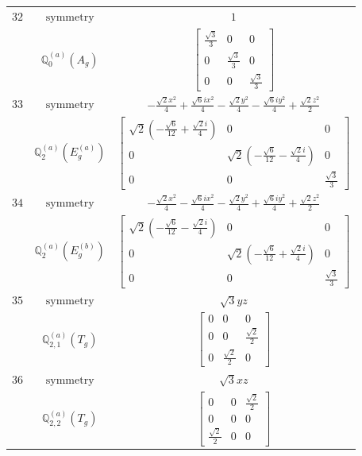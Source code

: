 \documentclass[fleqn,8pt,landscape]{jsarticle}
\begin{document}
\begin{longtable}{ccc}
$ 32 $ & $ \text{symmetry} $ & $ 1 $ \\
$  $ & $ \mathbb{Q}_{0}^{(a)}(A_{g}) $ & $ \begin{bmatrix} \frac{\sqrt{3}}{3} & 0 & 0 \\ 0 & \frac{\sqrt{3}}{3} & 0 \\ 0 & 0 & \frac{\sqrt{3}}{3} \end{bmatrix} $ \\ \hline
$ 33 $ & $ \text{symmetry} $ & $ - \frac{\sqrt{2} x^{2}}{4} + \frac{\sqrt{6} i x^{2}}{4} - \frac{\sqrt{2} y^{2}}{4} - \frac{\sqrt{6} i y^{2}}{4} + \frac{\sqrt{2} z^{2}}{2} $ \\
$  $ & $ \mathbb{Q}_{2}^{(a)}(E_{g}^{(a)}) $ & $ \begin{bmatrix} \sqrt{2} \left(- \frac{\sqrt{6}}{12} + \frac{\sqrt{2} i}{4}\right) & 0 & 0 \\ 0 & \sqrt{2} \left(- \frac{\sqrt{6}}{12} - \frac{\sqrt{2} i}{4}\right) & 0 \\ 0 & 0 & \frac{\sqrt{3}}{3} \end{bmatrix} $ \\ \hline
$ 34 $ & $ \text{symmetry} $ & $ - \frac{\sqrt{2} x^{2}}{4} - \frac{\sqrt{6} i x^{2}}{4} - \frac{\sqrt{2} y^{2}}{4} + \frac{\sqrt{6} i y^{2}}{4} + \frac{\sqrt{2} z^{2}}{2} $ \\
$  $ & $ \mathbb{Q}_{2}^{(a)}(E_{g}^{(b)}) $ & $ \begin{bmatrix} \sqrt{2} \left(- \frac{\sqrt{6}}{12} - \frac{\sqrt{2} i}{4}\right) & 0 & 0 \\ 0 & \sqrt{2} \left(- \frac{\sqrt{6}}{12} + \frac{\sqrt{2} i}{4}\right) & 0 \\ 0 & 0 & \frac{\sqrt{3}}{3} \end{bmatrix} $ \\ \hline
$ 35 $ & $ \text{symmetry} $ & $ \sqrt{3} y z $ \\
$  $ & $ \mathbb{Q}_{2,1}^{(a)}(T_{g}) $ & $ \begin{bmatrix} 0 & 0 & 0 \\ 0 & 0 & \frac{\sqrt{2}}{2} \\ 0 & \frac{\sqrt{2}}{2} & 0 \end{bmatrix} $ \\ \hline
$ 36 $ & $ \text{symmetry} $ & $ \sqrt{3} x z $ \\
$  $ & $ \mathbb{Q}_{2,2}^{(a)}(T_{g}) $ & $ \begin{bmatrix} 0 & 0 & \frac{\sqrt{2}}{2} \\ 0 & 0 & 0 \\ \frac{\sqrt{2}}{2} & 0 & 0 \end{bmatrix} $ \\ \hline

\end{longtable}
\end{document}
